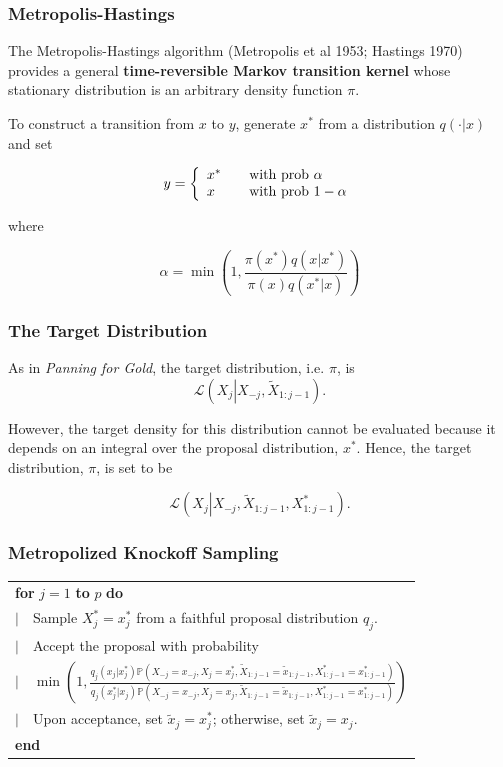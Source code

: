 \documentclass[
	11pt, %
]{beamer}
\begin{document}
\begin{frame}
	\frametitle{Metropolis-Hastings}
	The Metropolis-Hastings algorithm (Metropolis et al 1953; Hastings 1970) provides a general \textbf{time-reversible Markov transition kernel} whose stationary distribution is an arbitrary density function $\pi$.
	
	\bigskip
	
	To construct a transition from $x$ to $y$, generate $x^*$ from a distribution $q(\cdot|x)$ and set
	
	$$y=\left\{\begin{array}{l c l}
		x^* && \text{with prob }\alpha \\
		x && \text{with prob }1-\alpha
	\end{array}\right.$$
	
	where
	
	$$\alpha=\min\left(1,\dfrac{\pi(x^*)q(x|x^*)}{\pi(x)q(x^*|x)}\right)$$
\end{frame}

\begin{frame}
	\frametitle{The Target Distribution}
	As in \textit{Panning for Gold}, the target distribution, i.e. $\pi$, is $$\mathcal{L}\left(X_j\left|X_{-j},\tilde{X}_{1:j-1}\right.\right).$$
	
	\bigskip
	
	However, the target density for this distribution cannot be evaluated because it depends on an integral over the proposal distribution, $x^*$. Hence, the target distribution, $\pi$, is set to be
	
	$$\mathcal{L}\left(X_j\left|X_{-j},\tilde{X}_{1:j-1},X^*_{1:j-1}\right.\right).$$
\end{frame}

\begin{frame}
	\frametitle{Metropolized Knockoff Sampling}
	
	\begin{tabular}{l}
		\textbf{for} $j=1$ \textbf{to} $p$ \textbf{do} \\
		$|\text{     }$ Sample $X^*_j=x^*_j$ from a faithful proposal distribution $q_j$. \\
		$|\text{     }$ Accept the proposal with probability \\
		$|\text{                         }$ ${\scriptstyle\min\left(1,\frac{q_j(x_j|x^*_j)\mathbb{P}\left(X_{-j}=x_{-j},X_j=x^*_j,\tilde{X}_{1:j-1}=\tilde{x}_{1:j-1},X^*_{1:j-1}=x^*_{1:j-1}\right)}{q_j(x^*_j|x_j)\mathbb{P}\left(X_{-j}=x_{-j},X_j=x_j,\tilde{X}_{1:j-1}=\tilde{x}_{1:j-1},X^*_{1:j-1}=x^*_{1:j-1}\right)}\right)}$ \\
		$|\text{     }$ Upon acceptance, set $\tilde{x}_j=x^*_j$; otherwise, set $\tilde{x}_j=x_j$. \\
		\textbf{end}
	\end{tabular}
\end{frame}
\end{document}
